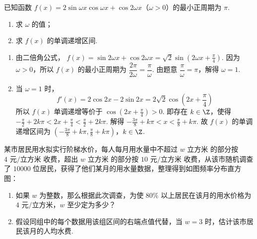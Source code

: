 \begin{problem}
已知函数 \(f(x)=2\sin\omega x\cos\omega x+\cos2\omega x\)（\(\omega>0\)）的最小正周期为 \(\pi\).

\begin{enumerate}
\item 求 \(\omega\) 的值；
\item 求 \(f(x)\) 的单调递增区间.
\end{enumerate}
\end{problem}

\begin{solution}
\begin{enumerate}
\item 由二倍角公式，
\(f(x)=\sin2\omega x+\cos2\omega x=\sqrt2\sin\left(2\omega x+\frac{\pi}{4}\right)\).
因为 \(\omega>0\)，所以 \(f(x)\) 的最小正周期为 \(\dfrac{2\pi}{2\omega}=\dfrac{\pi}{\omega}\). 由题意 \(\dfrac{\pi}{\omega}=\pi\)，解得 \(\omega=1\).

\item 当 \(\omega=1\) 时，
\[
f'(x)=2\cos2x-2\sin2x=2\sqrt2\cos\left(2x+\frac{\pi}{4}\right)
\]
所以 \(f(x)\) 单调递增等价于 \(\cos\left(2x+\frac{\pi}{4}\right)>0\).
即存在 \(k\in\Z\)，使得
\(-\frac{\pi}{2}+2k\pi<2x+\frac{\pi}{4}<\frac{\pi}{2}+2k\pi\).
解得
\(-\frac{3\pi}{8}+k\pi<x<\frac{\pi}{8}+k\pi\). 故 \(f(x)\) 的单调递增区间为 \(\left(-\frac{3\pi}{8}+k\pi,\frac{\pi}{8}+k\pi\right)\)，\(k\in\Z\).
\end{enumerate}
\end{solution}

\begin{problem}
某市居民用水拟实行阶梯水价，每人每月用水量中不超过 \(w\text{ 立方米}\) 的部分按 \(4\text{ 元/立方米}\) 收费，超出 \(w\text{ 立方米}\) 的部分按 \(10\text{ 元/立方米}\) 收费，从该市随机调查了 \(10000\) 位居民，获得了他们某月的用水量数据，整理得到如图频率分布直方图：

\begin{enumerate}
\item 如果 \(w\) 为整数，那么根据此次调查，为使 \(80\%\) 以上居民在该月的用水价格为 \(4\text{ 元/立方米}\)，\(w\) 至少定为多少？
\item 假设同组中的每个数据用该组区间的右端点值代替，当 \(w=3\) 时，估计该市居民该月的人均水费.
\end{enumerate}

\end{problem}

